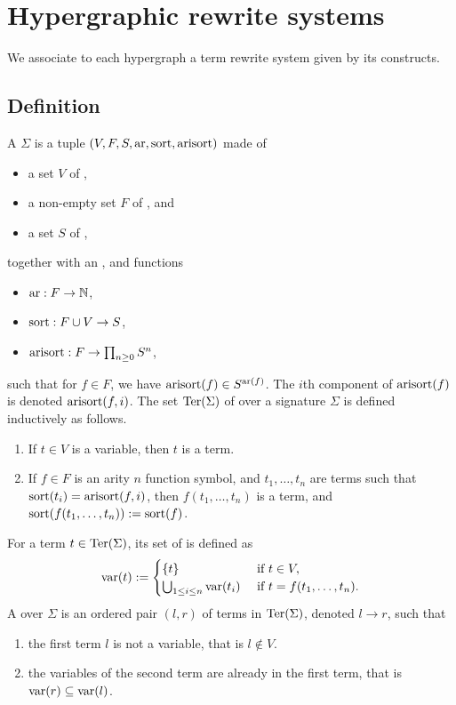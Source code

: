 
\section{Hypergraphic rewrite systems} 
\label{s:rewriting}

We associate to each hypergraph a term rewrite system given by its constructs.


\subsection{Definition}

A  $\Sigma$ is a tuple $(V,F,S,\mathrm{ar},\operatorname{sort},\operatorname{arisort})$ made of 
\begin{itemize}
  \item a set $V$ of ,
  \item a non-empty set $F$ of , and
  \item a set $S$ of ,
\end{itemize}
together with an ,  and  functions
\begin{itemize}
  \item $\mathrm{ar} : F \to \mathbb{N}$,
  \item $\operatorname{sort} : F \cup V \to S$,
  \item $\operatorname{arisort} : F \to \prod_{n \geq 0} S^{n}$,
\end{itemize}
such that for $f \in F$, we have $\operatorname{arisort}(f) \in S^{\mathrm{ar}(f)}$. 
The $i$th component of $\operatorname{arisort}(f)$ is denoted $\operatorname{arisort}(f,i)$.
The set $\operatorname{Ter}(\Sigma)$ of  over a signature $\Sigma$ is defined inductively as follows. 
\begin{enumerate}
  \item If $t \in V$ is a variable, then $t$ is a term.
  \item If $f \in F$ is an arity $n$ function symbol, and $t_1,\ldots,t_n$ are terms such that $\operatorname{sort}(t_i)=\operatorname{arisort}(f,i)$, then $f(t_1,\ldots,t_n)$ is a term, and $\operatorname{sort}(f(t_1,\ldots,t_n)):=\operatorname{sort}(f)$.
\end{enumerate}
For a term $t \in \operatorname{Ter}(\Sigma)$, its set of  is defined as 
\begin{equation*}
  \operatorname{var}(t) := 
  \begin{cases}
    \{t\} & \text{ if } t \in V, \\
    \bigcup_{1 \leq i \leq n}\operatorname{var}(t_i) & \text{ if } t=f(t_1,\ldots,t_n).
  \end{cases}
\end{equation*}
A  over $\Sigma$ is an ordered pair $(l,r)$ of terms in $\operatorname{Ter}(\Sigma)$, denoted $l \to r$, such that
\begin{enumerate}
  \item the first term $l$ is not a variable, that is $l \notin V$.
  \item the variables of the second term are already in the first term, that is $\operatorname{var}(r) \subseteq \operatorname{var}(l)$.
\end{enumerate}

